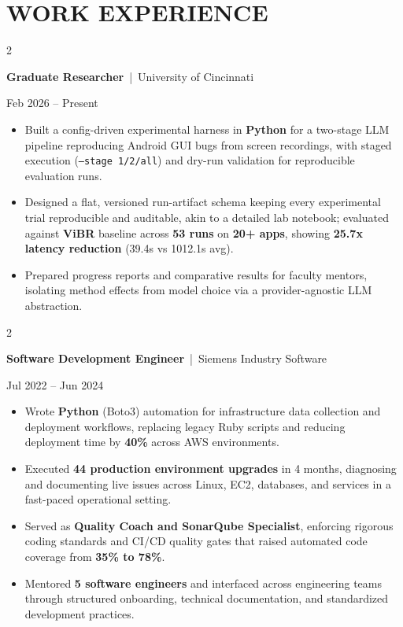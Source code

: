 \documentclass[10pt, letterpaper]{article}
\newenvironment{highlights}{
    \begin{itemize}[
        topsep=0.10 cm,
        parsep=0.06 cm,
        partopsep=0pt,
        itemsep=0.06 cm,
        leftmargin=12pt
    ]
}{
    \end{itemize}
}
\newenvironment{twocolentry}[2][]{
    \onecolentry
    \def\secondColumn{#2}
    \setcolumnwidth{\fill, 4.5 cm}
    \begin{paracol}{2}
}{
    \switchcolumn \raggedleft \secondColumn
    \end{paracol}
    \endonecolentry
}
\begin{document}
\section{WORK EXPERIENCE}
\begin{twocolentry}{Feb 2026 -- Present}
\textbf{Graduate Researcher} \,|\, University of Cincinnati
\end{twocolentry}
\begin{highlights}
  \item Built a config-driven experimental harness in \textbf{Python} for a two-stage LLM pipeline reproducing Android GUI bugs from screen recordings, with staged execution (\texttt{--stage 1/2/all}) and dry-run validation for reproducible evaluation runs.
  \item Designed a flat, versioned run-artifact schema keeping every experimental trial reproducible and auditable, akin to a detailed lab notebook; evaluated against \textbf{ViBR} baseline across \textbf{53 runs} on \textbf{20+ apps}, showing \textbf{25.7x latency reduction} (39.4s vs 1012.1s avg).
  \item Prepared progress reports and comparative results for faculty mentors, isolating method effects from model choice via a provider-agnostic LLM abstraction.
\end{highlights}

\vspace{0.15 cm}

\begin{twocolentry}{Jul 2022 -- Jun 2024}
\textbf{Software Development Engineer} \,|\, Siemens Industry Software
\end{twocolentry}
\begin{highlights}
  \item Wrote \textbf{Python} (Boto3) automation for infrastructure data collection and deployment workflows, replacing legacy Ruby scripts and reducing deployment time by \textbf{40\%} across AWS environments.
  \item Executed \textbf{44 production environment upgrades} in 4 months, diagnosing and documenting live issues across Linux, EC2, databases, and services in a fast-paced operational setting.
  \item Served as \textbf{Quality Coach and SonarQube Specialist}, enforcing rigorous coding standards and CI/CD quality gates that raised automated code coverage from \textbf{35\% to 78\%}.
  \item Mentored \textbf{5 software engineers} and interfaced across engineering teams through structured onboarding, technical documentation, and standardized development practices.
\end{highlights}
\end{document}
